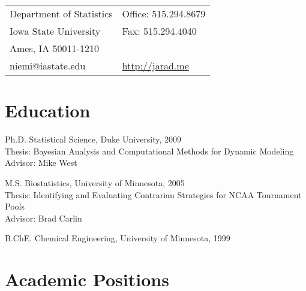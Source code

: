 \documentclass[overlapped,line]{res}
\begin{document}

\setlength{\leftmargini}{0em}
\renewcommand{\labelitemi}{}

\renewcommand{\namefont}{\large\textbf}



\begin{resume}

\begin{tabular}{l@{\hskip 2in}l}
  Department of Statistics     & Office: 515.294.8679 \\
  Iowa State University                   &  Fax: \hspace{.07in} 515.294.4040 \\
  Ames, IA 50011-1210        & \\
  niemi@iastate.edu  & \url{http://jarad.me}
\end{tabular}




\section{\bf Education}
Ph.D. Statistical Science, Duke University, 2009 \\%
Thesis: Bayesian Analysis and Computational Methods for Dynamic Modeling\\
Advisor: Mike West

M.S. Biostatistics, University of Minnesota, 2005\\%
Thesis: Identifying and Evaluating Contrarian Strategies for NCAA Tournament Pools \\
Advisor: Brad Carlin

B.ChE. Chemical Engineering, University of Minnesota, 1999%



\section{\bf Academic Positions}


\end{resume}
\end{document}
